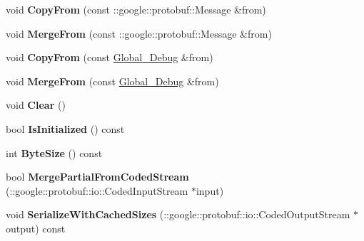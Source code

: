 \begin{DoxyCompactItemize}
\item 
void {\bfseries Copy\+From} (const \+::google\+::protobuf\+::\+Message \&from)\hypertarget{classvss__debug_1_1Global__Debug_a77f2c60180607e1cfc605fdcb913a79b}{}\label{classvss__debug_1_1Global__Debug_a77f2c60180607e1cfc605fdcb913a79b}

\item 
void {\bfseries Merge\+From} (const \+::google\+::protobuf\+::\+Message \&from)\hypertarget{classvss__debug_1_1Global__Debug_ac69a78aa769aa584c765ecceaf7fba5b}{}\label{classvss__debug_1_1Global__Debug_ac69a78aa769aa584c765ecceaf7fba5b}

\item 
void {\bfseries Copy\+From} (const \hyperlink{classvss__debug_1_1Global__Debug}{Global\+\_\+\+Debug} \&from)\hypertarget{classvss__debug_1_1Global__Debug_a090fc098850d32138d9b638bc0efe457}{}\label{classvss__debug_1_1Global__Debug_a090fc098850d32138d9b638bc0efe457}

\item 
void {\bfseries Merge\+From} (const \hyperlink{classvss__debug_1_1Global__Debug}{Global\+\_\+\+Debug} \&from)\hypertarget{classvss__debug_1_1Global__Debug_acef49d0fd298c356e6c11fd1c3407681}{}\label{classvss__debug_1_1Global__Debug_acef49d0fd298c356e6c11fd1c3407681}

\item 
void {\bfseries Clear} ()\hypertarget{classvss__debug_1_1Global__Debug_a903e3d4e444632048f78d7c2e707367b}{}\label{classvss__debug_1_1Global__Debug_a903e3d4e444632048f78d7c2e707367b}

\item 
bool {\bfseries Is\+Initialized} () const \hypertarget{classvss__debug_1_1Global__Debug_accd80d5e07db4a5cf2e2f254f500b874}{}\label{classvss__debug_1_1Global__Debug_accd80d5e07db4a5cf2e2f254f500b874}

\item 
int {\bfseries Byte\+Size} () const \hypertarget{classvss__debug_1_1Global__Debug_ada6ae1d20ee44cb870fe5175a371dc43}{}\label{classvss__debug_1_1Global__Debug_ada6ae1d20ee44cb870fe5175a371dc43}

\item 
bool {\bfseries Merge\+Partial\+From\+Coded\+Stream} (\+::google\+::protobuf\+::io\+::\+Coded\+Input\+Stream $\ast$input)\hypertarget{classvss__debug_1_1Global__Debug_a75302270b4981afeda6355bcda846f24}{}\label{classvss__debug_1_1Global__Debug_a75302270b4981afeda6355bcda846f24}

\item 
void {\bfseries Serialize\+With\+Cached\+Sizes} (\+::google\+::protobuf\+::io\+::\+Coded\+Output\+Stream $\ast$output) const \hypertarget{classvss__debug_1_1Global__Debug_afe38cb71872baa45a79fd571e4382da2}{}\label{classvss__debug_1_1Global__Debug_afe38cb71872baa45a79fd571e4382da2}


\end{DoxyCompactItemize}
